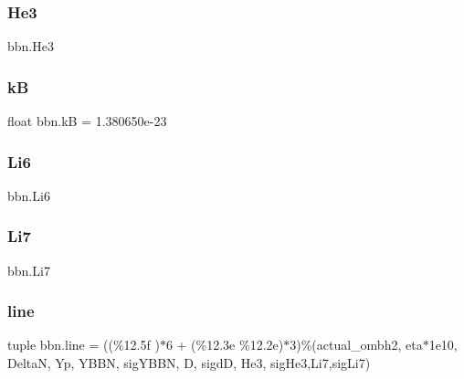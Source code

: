 \mbox{\label{namespacebbn_a9555376bf33bf65ae1f681790b3d4254}} 
\subsubsection{\texorpdfstring{He3}{He3}}
{\footnotesize\ttfamily bbn.\+He3}

\mbox{\label{namespacebbn_ad8b80a31c3103c575ee91606b28c00b6}} 
\subsubsection{\texorpdfstring{kB}{kB}}
{\footnotesize\ttfamily float bbn.\+kB = 1.\+380650e-\/23}

\mbox{\label{namespacebbn_aa1a56fdfe29a2355c7f96d84bd324e75}} 
\subsubsection{\texorpdfstring{Li6}{Li6}}
{\footnotesize\ttfamily bbn.\+Li6}

\mbox{\label{namespacebbn_a5ed6387f606410099a6ddc296df92172}} 
\subsubsection{\texorpdfstring{Li7}{Li7}}
{\footnotesize\ttfamily bbn.\+Li7}

\mbox{\label{namespacebbn_ac9bb8b77af91c3a7edb1568c3f455083}} 
\subsubsection{\texorpdfstring{line}{line}}
{\footnotesize\ttfamily tuple bbn.\+line = ((\textquotesingle{}\%12.\+5f \textquotesingle{})$\ast$6 + (\textquotesingle{}\%12.\+3e \%12.\+2e\textquotesingle{})$\ast$3)\%(actual\+\_\+ombh2, eta$\ast$1e10, Delta\+N, Yp, Y\+B\+B\+N, sig\+Y\+B\+B\+N, D, sigd\+D, He3, sig\+He3,\+Li7,sig\+Li7)}

\mbox{\label{namespacebbn_a2ac37326174932ddf6ffd8f25c4619a8}} 
